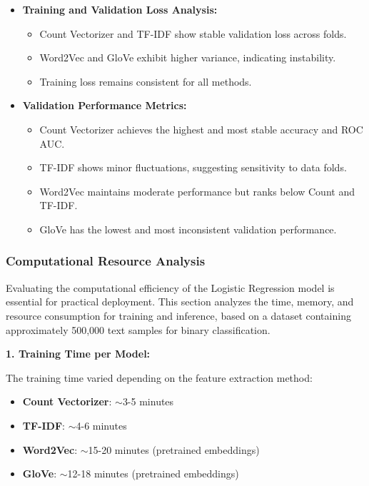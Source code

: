 \begin{itemize}
    \item \textbf{Training and Validation Loss Analysis:}
    \begin{itemize}
        \item Count Vectorizer and TF-IDF show stable validation loss across folds.
        \item Word2Vec and GloVe exhibit higher variance, indicating instability.
        \item Training loss remains consistent for all methods.
    \end{itemize}
    
    \item \textbf{Validation Performance Metrics:}
    \begin{itemize}
        \item Count Vectorizer achieves the highest and most stable accuracy and ROC AUC.
        \item TF-IDF shows minor fluctuations, suggesting sensitivity to data folds.
        \item Word2Vec maintains moderate performance but ranks below Count and TF-IDF.
        \item GloVe has the lowest and most inconsistent validation performance.
    \end{itemize}
\end{itemize}

\subsubsection{Computational Resource Analysis}

Evaluating the computational efficiency of the Logistic Regression model is essential for practical deployment. This section analyzes the time, memory, and resource consumption for training and inference, based on a dataset containing approximately 500,000 text samples for binary classification.

\textbf{1. Training Time per Model:}  

The training time varied depending on the feature extraction method:  
\begin{itemize}
    \item \textbf{Count Vectorizer}: $\sim$3-5 minutes  
    \item \textbf{TF-IDF}: $\sim$4-6 minutes  
    \item \textbf{Word2Vec}: $\sim$15-20 minutes (pretrained embeddings)  
    \item \textbf{GloVe}: $\sim$12-18 minutes (pretrained embeddings)  
\end{itemize}

